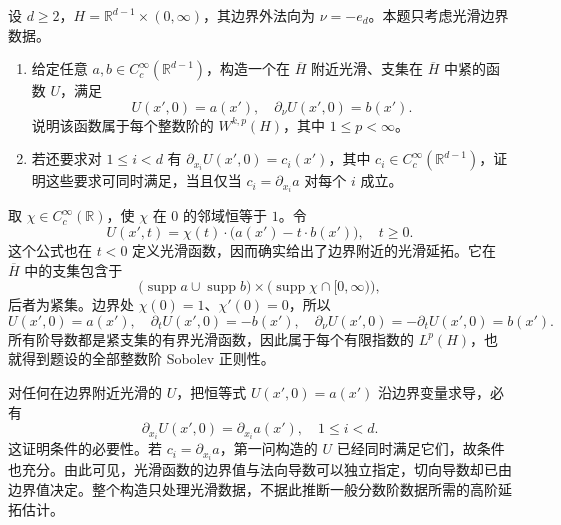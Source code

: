 \begin{optionalexercise}\label{b1:ex:23-smooth-normal-data}
设 \(d\ge2\)，\(H=\mathbb R^{d-1}\times(0,\infty)\)，其边界外法向为
\(\nu=-e_d\)。本题只考虑光滑边界数据。
\begin{enumerate}
 \item\label{b1:item:23-independent-smooth-normal-data}
 给定任意 \(a,b\in C_c^\infty(\mathbb R^{d-1})\)，构造一个在
 \(\overline H\) 附近光滑、支集在 \(\overline H\) 中紧的函数 \(U\)，满足
 \[
  U(x',0)=a(x'),\quad \partial_\nu U(x',0)=b(x').
 \]
 说明该函数属于每个整数阶的 \(W^{k,p}(H)\)，其中 \(1\le p<\infty\)。
 \item\label{b1:item:23-smooth-tangential-compatibility}
 若还要求对 \(1\le i<d\) 有
 \(\partial_{x_i}U(x',0)=c_i(x')\)，其中 \(c_i\in C_c^\infty(\mathbb R^{d-1})\)，证明这些要求可同时满足，当且仅当
 \(c_i=\partial_{x_i}a\) 对每个 \(i\) 成立。
\end{enumerate}
\end{optionalexercise}
\begin{solution}
取 \(\chi\in C_c^\infty(\mathbb R)\)，使 \(\chi\) 在 \(0\) 的邻域恒等于 \(1\)。令
\[
 U(x',t)=\chi(t)\cdot\bigl(a(x')-t\cdot b(x')\bigr),\quad t\ge0.
\]
这个公式也在 \(t<0\) 定义光滑函数，因而确实给出了边界附近的光滑延拓。它在
\(\overline H\) 中的支集包含于
\[
 \bigl(\operatorname{supp}a\cup\operatorname{supp}b\bigr)
       \times\bigl(\operatorname{supp}\chi\cap[0,\infty)\bigr),
\]
后者为紧集。边界处 \(\chi(0)=1\)、\(\chi'(0)=0\)，所以
\[
 U(x',0)=a(x'),\quad
 \partial_tU(x',0)=-b(x'),\quad
 \partial_\nu U(x',0)=-\partial_tU(x',0)=b(x').
\]
所有阶导数都是紧支集的有界光滑函数，因此属于每个有限指数的 \(L^p(H)\)，也就得到题设的全部整数阶 Sobolev 正则性。

对任何在边界附近光滑的 \(U\)，把恒等式 \(U(x',0)=a(x')\) 沿边界变量求导，必有
\[
 \partial_{x_i}U(x',0)=\partial_{x_i}a(x'),\quad 1\le i<d.
\]
这证明条件的必要性。若 \(c_i=\partial_{x_i}a\)，第一问构造的 \(U\) 已经同时满足它们，故条件也充分。由此可见，光滑函数的边界值与法向导数可以独立指定，切向导数却已由边界值决定。整个构造只处理光滑数据，不据此推断一般分数阶数据所需的高阶延拓估计。
\end{solution}
